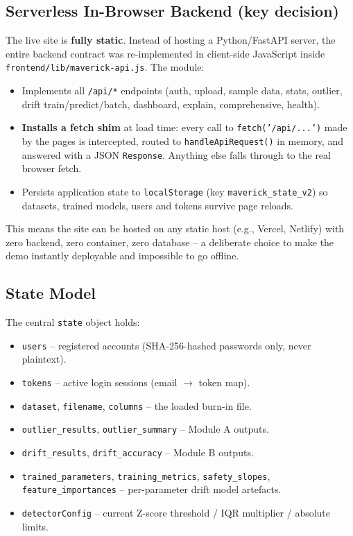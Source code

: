 \documentclass[11pt,a4paper]{article}
\newcommand{\code}[1]{\texttt{\small #1}}
\begin{document}
\subsection{Serverless In-Browser Backend (key decision)}
The live site is \textbf{fully static}. Instead of hosting a Python/FastAPI server, the entire
backend contract was re-implemented in client-side JavaScript inside
\code{frontend/lib/maverick-api.js}. The module:

\begin{itemize}[leftmargin=1.5em]
  \item Implements all \code{/api/*} endpoints (auth, upload, sample data, stats, outlier,
        drift train/predict/batch, dashboard, explain, comprehensive, health).
  \item \textbf{Installs a fetch shim} at load time: every call to
        \code{fetch('/api/...')} made by the pages is intercepted, routed to
        \code{handleApiRequest()} in memory, and answered with a JSON \code{Response}. Anything
        else falls through to the real browser fetch.
  \item Persists application state to \code{localStorage} (key \code{maverick\_state\_v2}) so
        datasets, trained models, users and tokens survive page reloads.
\end{itemize}

This means the site can be hosted on any static host (e.g., Vercel, Netlify) with zero backend,
zero container, zero database -- a deliberate choice to make the demo instantly deployable and
impossible to go offline.

\subsection{State Model}
The central \code{state} object holds:
\begin{itemize}[leftmargin=1.5em]
  \item \code{users} -- registered accounts (SHA-256-hashed passwords only, never plaintext).
  \item \code{tokens} -- active login sessions (email $\rightarrow$ token map).
  \item \code{dataset}, \code{filename}, \code{columns} -- the loaded burn-in file.
  \item \code{outlier\_results}, \code{outlier\_summary} -- Module A outputs.
  \item \code{drift\_results}, \code{drift\_accuracy} -- Module B outputs.
  \item \code{trained\_parameters}, \code{training\_metrics}, \code{safety\_slopes},
        \code{feature\_importances} -- per-parameter drift model artefacts.
  \item \code{detectorConfig} -- current Z-score threshold / IQR multiplier / absolute limits.
\end{itemize}
\end{document}
